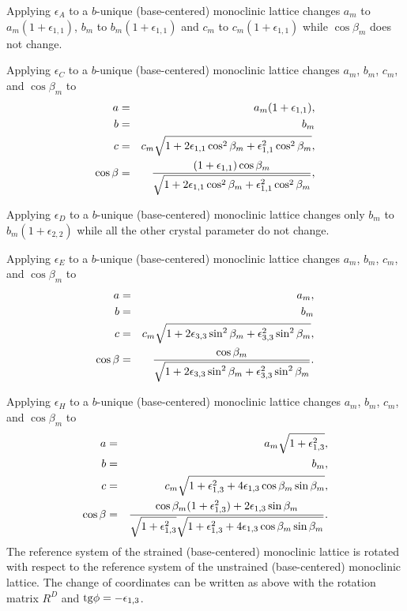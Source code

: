 \documentclass[12pt,a4paper]{article}
\begin{document}
Applying $\epsilon_A$ to a $b$-unique (base-centered) monoclinic 
lattice changes
$a_m$ to $a_m(1+\epsilon_{1,1})$, $b_m$ to $b_m(1+\epsilon_{1,1})$
and $c_m$ to $c_m(1+\epsilon_{1,1})$ while $\cos \beta_m$
does not change.

Applying $\epsilon_C$ to a $b$-unique (base-centered) monoclinic lattice 
changes $a_m$, $b_m$, $c_m$, and $\cos \beta_m$ to 
\begin{eqnarray}
a&=&a_m(1+\epsilon_{1,1}), \\
b&=&b_m \\
c&=&c_m \sqrt{1+2 \epsilon_{1,1}\cos^2\beta_m
+\epsilon_{1,1}^2 \cos^2\beta_m}, \\
\cos\beta &=& {(1+\epsilon_{1,1}) \cos\beta_m \over 
\sqrt{1+2 \epsilon_{1,1}\cos^2\beta_m
+\epsilon_{1,1}^2 \cos^2\beta_m}},
\end{eqnarray}

Applying $\epsilon_D$ to a $b$-unique (base-centered) monoclinic 
lattice changes
only $b_m$ to $b_m(1+\epsilon_{2,2})$ while all the other crystal
parameter do not change.

Applying $\epsilon_E$ to a $b$-unique (base-centered) monoclinic lattice 
changes $a_m$, $b_m$, $c_m$, and $\cos \beta_m$ to 
\begin{eqnarray}
a&=&a_m, \\
b&=&b_m \\
c&=&c_m \sqrt{1+2 \epsilon_{3,3}\sin^2\beta_m
+\epsilon_{3,3}^2 \sin^2\beta_m}, \\
\cos\beta &=& {\cos\beta_m \over \sqrt{1+2 \epsilon_{3,3}\sin^2\beta_m
+\epsilon_{3,3}^2 \sin^2\beta_m}}.
\end{eqnarray}

Applying $\epsilon_H$ to a $b$-unique (base-centered) monoclinic lattice 
changes $a_m$, $b_m$, $c_m$, and $\cos \beta_m$ to 
\begin{eqnarray}
a&=&a_m \sqrt{1+\epsilon_{1,3}^2}, \\
b&=&b_m, \\
c&=&c_m \sqrt{1+\epsilon_{1,3}^2
+4\epsilon_{1,3} \cos\beta_m \sin\beta_m}, \\
\cos\beta &=& {\cos\beta_m (1+\epsilon_{1,3}^2) + 2 \epsilon_{1,3} 
\sin \beta_m \over \sqrt{1+\epsilon_{1,3}^2}
\sqrt{1+\epsilon_{1,3}^2+4\epsilon_{1,3} \cos\beta_m \sin\beta_m}}.
\end{eqnarray}
The reference system of the strained (base-centered) monoclinic 
lattice is rotated 
with respect to the reference system of the unstrained  
(base-centered) monoclinic lattice. 
The change of coordinates can be written as above with the rotation matrix 
$R^D$ and ${\rm tg}\phi=-\epsilon_{1,3}$.
\end{document}

